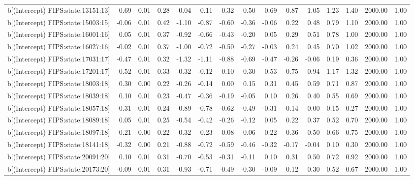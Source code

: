 \begin{table}[ht]
\begin{tabular}{rrrrrrrrrrrrrrr}
  b[(Intercept) FIPS:state:13151:13] & 0.69 & 0.01 & 0.28 & -0.04 & 0.11 & 0.32 & 0.50 & 0.69 & 0.87 & 1.05 & 1.23 & 1.40 & 2000.00 & 1.00 \\ 
  b[(Intercept) FIPS:state:15003:15] & -0.06 & 0.01 & 0.42 & -1.10 & -0.87 & -0.60 & -0.36 & -0.06 & 0.22 & 0.48 & 0.79 & 1.10 & 2000.00 & 1.00 \\ 
  b[(Intercept) FIPS:state:16001:16] & 0.05 & 0.01 & 0.37 & -0.92 & -0.66 & -0.43 & -0.20 & 0.05 & 0.29 & 0.51 & 0.78 & 1.00 & 2000.00 & 1.00 \\ 
  b[(Intercept) FIPS:state:16027:16] & -0.02 & 0.01 & 0.37 & -1.00 & -0.72 & -0.50 & -0.27 & -0.03 & 0.24 & 0.45 & 0.70 & 1.02 & 2000.00 & 1.00 \\ 
  b[(Intercept) FIPS:state:17031:17] & -0.47 & 0.01 & 0.32 & -1.32 & -1.11 & -0.88 & -0.69 & -0.47 & -0.26 & -0.06 & 0.19 & 0.36 & 2000.00 & 1.00 \\ 
  b[(Intercept) FIPS:state:17201:17] & 0.52 & 0.01 & 0.33 & -0.32 & -0.12 & 0.10 & 0.30 & 0.53 & 0.75 & 0.94 & 1.17 & 1.32 & 2000.00 & 1.00 \\ 
  b[(Intercept) FIPS:state:18003:18] & 0.30 & 0.00 & 0.22 & -0.26 & -0.14 & 0.00 & 0.15 & 0.31 & 0.45 & 0.59 & 0.71 & 0.87 & 2000.00 & 1.00 \\ 
  b[(Intercept) FIPS:state:18039:18] & 0.10 & 0.01 & 0.23 & -0.47 & -0.36 & -0.19 & -0.05 & 0.10 & 0.26 & 0.40 & 0.55 & 0.69 & 2000.00 & 1.00 \\ 
  b[(Intercept) FIPS:state:18057:18] & -0.31 & 0.01 & 0.24 & -0.89 & -0.78 & -0.62 & -0.49 & -0.31 & -0.14 & 0.00 & 0.15 & 0.27 & 2000.00 & 1.00 \\ 
  b[(Intercept) FIPS:state:18089:18] & 0.05 & 0.01 & 0.25 & -0.54 & -0.42 & -0.26 & -0.12 & 0.05 & 0.22 & 0.37 & 0.52 & 0.70 & 2000.00 & 1.00 \\ 
  b[(Intercept) FIPS:state:18097:18] & 0.21 & 0.00 & 0.22 & -0.32 & -0.23 & -0.08 & 0.06 & 0.22 & 0.36 & 0.50 & 0.66 & 0.75 & 2000.00 & 1.00 \\ 
  b[(Intercept) FIPS:state:18141:18] & -0.32 & 0.00 & 0.21 & -0.88 & -0.72 & -0.59 & -0.46 & -0.32 & -0.17 & -0.04 & 0.10 & 0.30 & 2000.00 & 1.00 \\ 
  b[(Intercept) FIPS:state:20091:20] & 0.10 & 0.01 & 0.31 & -0.70 & -0.53 & -0.31 & -0.11 & 0.10 & 0.31 & 0.50 & 0.72 & 0.92 & 2000.00 & 1.00 \\ 
  b[(Intercept) FIPS:state:20173:20] & -0.09 & 0.01 & 0.31 & -0.93 & -0.71 & -0.49 & -0.30 & -0.09 & 0.12 & 0.30 & 0.52 & 0.67 & 2000.00 & 1.00 \\ 

\end{tabular}
\end{table}
